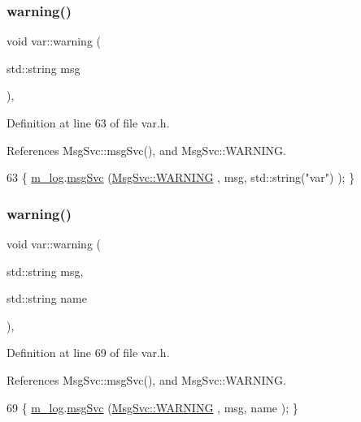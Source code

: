 \subsubsection{\texorpdfstring{warning()}{warning()}\hspace{0.1cm}{\footnotesize\ttfamily [1/2]}}
{\footnotesize\ttfamily void var\+::warning (\begin{DoxyParamCaption}\item[{std\+::string}]{msg }\end{DoxyParamCaption})\hspace{0.3cm}{\ttfamily [inline]}, {\ttfamily [private]}}



Definition at line 63 of file var.\+h.



References Msg\+Svc\+::msg\+Svc(), and Msg\+Svc\+::\+W\+A\+R\+N\+I\+NG.


\begin{DoxyCode}
63 \{ \hyperlink{classvar_a5dfdc5180270038b686ad3013874a026}{m\_log}.\hyperlink{classMsgSvc_ad25f18047920cc59a314e5098259711c}{msgSvc} (\hyperlink{classMsgSvc_ae671eb7301996cd049d2da8a65925926a7cefae88f2ba26b2b05b676a383c834b}{MsgSvc::WARNING} , msg, std::string(\textcolor{stringliteral}{"var"}) ); \}
\end{DoxyCode}
\mbox{\label{classvar_af8e180a414b085d50d35ba585bf7717f}} 
\subsubsection{\texorpdfstring{warning()}{warning()}\hspace{0.1cm}{\footnotesize\ttfamily [2/2]}}
{\footnotesize\ttfamily void var\+::warning (\begin{DoxyParamCaption}\item[{std\+::string}]{msg,  }\item[{std\+::string}]{name }\end{DoxyParamCaption})\hspace{0.3cm}{\ttfamily [inline]}, {\ttfamily [private]}}



Definition at line 69 of file var.\+h.



References Msg\+Svc\+::msg\+Svc(), and Msg\+Svc\+::\+W\+A\+R\+N\+I\+NG.


\begin{DoxyCode}
69 \{ \hyperlink{classvar_a5dfdc5180270038b686ad3013874a026}{m\_log}.\hyperlink{classMsgSvc_ad25f18047920cc59a314e5098259711c}{msgSvc} (\hyperlink{classMsgSvc_ae671eb7301996cd049d2da8a65925926a7cefae88f2ba26b2b05b676a383c834b}{MsgSvc::WARNING} , msg, name ); \}
\end{DoxyCode}


